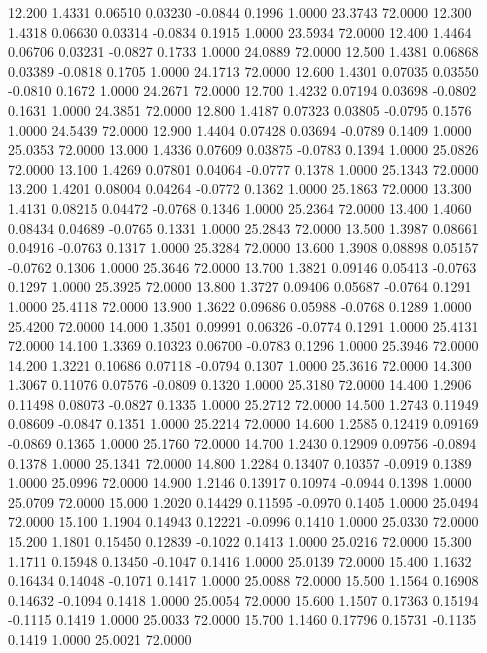   12.200   1.4331   0.06510   0.03230  -0.0844   0.1996   1.0000  23.3743  72.0000
  12.300   1.4318   0.06630   0.03314  -0.0834   0.1915   1.0000  23.5934  72.0000
  12.400   1.4464   0.06706   0.03231  -0.0827   0.1733   1.0000  24.0889  72.0000
  12.500   1.4381   0.06868   0.03389  -0.0818   0.1705   1.0000  24.1713  72.0000
  12.600   1.4301   0.07035   0.03550  -0.0810   0.1672   1.0000  24.2671  72.0000
  12.700   1.4232   0.07194   0.03698  -0.0802   0.1631   1.0000  24.3851  72.0000
  12.800   1.4187   0.07323   0.03805  -0.0795   0.1576   1.0000  24.5439  72.0000
  12.900   1.4404   0.07428   0.03694  -0.0789   0.1409   1.0000  25.0353  72.0000
  13.000   1.4336   0.07609   0.03875  -0.0783   0.1394   1.0000  25.0826  72.0000
  13.100   1.4269   0.07801   0.04064  -0.0777   0.1378   1.0000  25.1343  72.0000
  13.200   1.4201   0.08004   0.04264  -0.0772   0.1362   1.0000  25.1863  72.0000
  13.300   1.4131   0.08215   0.04472  -0.0768   0.1346   1.0000  25.2364  72.0000
  13.400   1.4060   0.08434   0.04689  -0.0765   0.1331   1.0000  25.2843  72.0000
  13.500   1.3987   0.08661   0.04916  -0.0763   0.1317   1.0000  25.3284  72.0000
  13.600   1.3908   0.08898   0.05157  -0.0762   0.1306   1.0000  25.3646  72.0000
  13.700   1.3821   0.09146   0.05413  -0.0763   0.1297   1.0000  25.3925  72.0000
  13.800   1.3727   0.09406   0.05687  -0.0764   0.1291   1.0000  25.4118  72.0000
  13.900   1.3622   0.09686   0.05988  -0.0768   0.1289   1.0000  25.4200  72.0000
  14.000   1.3501   0.09991   0.06326  -0.0774   0.1291   1.0000  25.4131  72.0000
  14.100   1.3369   0.10323   0.06700  -0.0783   0.1296   1.0000  25.3946  72.0000
  14.200   1.3221   0.10686   0.07118  -0.0794   0.1307   1.0000  25.3616  72.0000
  14.300   1.3067   0.11076   0.07576  -0.0809   0.1320   1.0000  25.3180  72.0000
  14.400   1.2906   0.11498   0.08073  -0.0827   0.1335   1.0000  25.2712  72.0000
  14.500   1.2743   0.11949   0.08609  -0.0847   0.1351   1.0000  25.2214  72.0000
  14.600   1.2585   0.12419   0.09169  -0.0869   0.1365   1.0000  25.1760  72.0000
  14.700   1.2430   0.12909   0.09756  -0.0894   0.1378   1.0000  25.1341  72.0000
  14.800   1.2284   0.13407   0.10357  -0.0919   0.1389   1.0000  25.0996  72.0000
  14.900   1.2146   0.13917   0.10974  -0.0944   0.1398   1.0000  25.0709  72.0000
  15.000   1.2020   0.14429   0.11595  -0.0970   0.1405   1.0000  25.0494  72.0000
  15.100   1.1904   0.14943   0.12221  -0.0996   0.1410   1.0000  25.0330  72.0000
  15.200   1.1801   0.15450   0.12839  -0.1022   0.1413   1.0000  25.0216  72.0000
  15.300   1.1711   0.15948   0.13450  -0.1047   0.1416   1.0000  25.0139  72.0000
  15.400   1.1632   0.16434   0.14048  -0.1071   0.1417   1.0000  25.0088  72.0000
  15.500   1.1564   0.16908   0.14632  -0.1094   0.1418   1.0000  25.0054  72.0000
  15.600   1.1507   0.17363   0.15194  -0.1115   0.1419   1.0000  25.0033  72.0000
  15.700   1.1460   0.17796   0.15731  -0.1135   0.1419   1.0000  25.0021  72.0000
